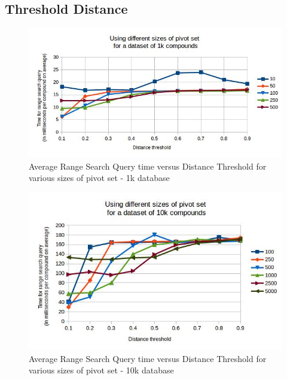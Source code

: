 \subsection{Threshold Distance}

\begin{figure}[ht]	
\centering
\includegraphics[width=1 \columnwidth]{img/image2.jpg}
\caption{Average Range Search Query time versus Distance Threshold for various sizes of pivot set - 1k database}
\label{fig:5.2a}
\end{figure}


\begin{figure}[ht]	
\centering
\includegraphics[width=1 \columnwidth]{img/image3.jpg}
\caption{Average Range Search Query time versus Distance Threshold for various sizes of pivot set - 10k database}
\label{fig:5.3}
\end{figure}


